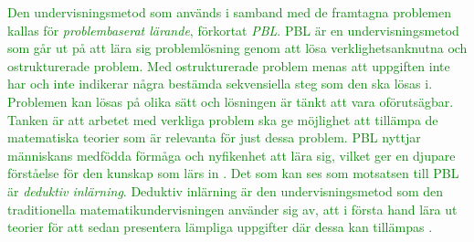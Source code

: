 \textcolor{green}{Den undervisningsmetod som används i samband med de framtagna problemen kallas för \textit{problembaserat lärande}, förkortat \textit{PBL}. PBL är en undervisningsmetod som går ut på att lära sig problemlösning genom att lösa verklighetsanknutna och ostrukturerade problem. Med ostrukturerade problem menas att uppgiften inte har och inte indikerar några bestämda sekvensiella steg som den ska lösas i. Problemen kan lösas på olika sätt och lösningen är tänkt att vara oförutsägbar. Tanken är att arbetet med verkliga problem ska ge möjlighet att tillämpa de matematiska teorier som är relevanta för just dessa problem. PBL nyttjar människans medfödda förmåga och nyfikenhet att lära sig, vilket ger en djupare förståelse för den kunskap som lärs in \cite{PBLdefinition} \cite{djupareKunskapPBL}. Det som kan ses som motsatsen till PBL är \textit{deduktiv inlärning}. Deduktiv inlärning är den undervisningsmetod som den traditionella matematikundervisningen använder sig av, att i första hand lära ut teorier för att sedan presentera lämpliga uppgifter där dessa kan tillämpas \cite{deduktivInlärning}.}


%
%
%
